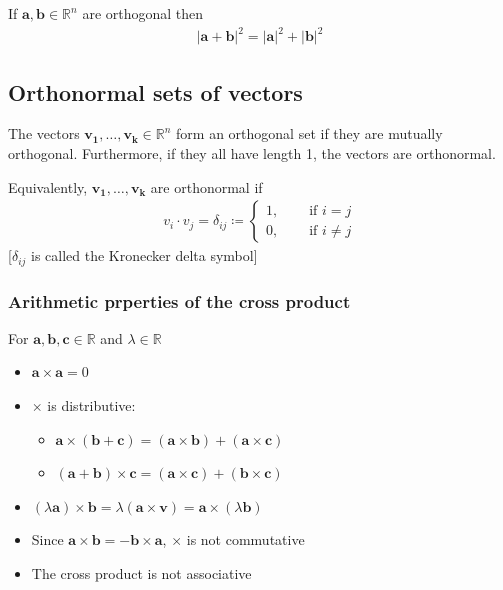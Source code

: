 \documentclass{report}
\renewcommand{\vec}{\mathbf}
\begin{document}
	If $\mathbf{a}, \mathbf{b} \in \mathbb{R}^n$ are orthogonal then
	\begin{align*}
		|\mathbf{a} + \mathbf{b}|^2 = |\mathbf{a}|^2 + |\mathbf{b}|^2
	\end{align*}

	\subsection{Orthonormal sets of vectors}

		The vectors $\mathbf{v_1}, \dots, \mathbf{v_k} \in \mathbb{R}^n$ form an orthogonal set if they are mutually orthogonal. Furthermore, if they all have length 1, the vectors are orthonormal.

		Equivalently, $\mathbf{v_1}, \dots, \mathbf{v_k}$ are orthonormal if
		\begin{align*}
			v_i \cdot v_j = \delta_{ij} \coloneq \begin{cases}1,\quad & \text{ if } i = j	\\ 0, & \text{ if } i \neq j\end{cases}
		\end{align*}
		[$\delta_{ij}$ is called the Kronecker delta symbol]


		\subsubsection{Arithmetic prperties of the cross product}
			
			For $\vec{a}, \vec{b}, \vec{c} \in \mathbb{R}$ and $\lambda \in \mathbb{R}$

				\begin{itemize}
					\item $\vec{a} \times \vec{a} = 0$
					\item $\times$ is distributive:
						\begin{itemize}
							\item $\vec{a} \times (\vec{b} + \vec{c}) = (\vec{a} \times \vec{b}) + (\vec{a} \times \vec{c})$
							\item $(\vec{a} + \vec{b}) \times \vec{c} = (\vec{a} \times \vec{c}) + (\vec{b} \times \vec{c})$
						\end{itemize}
					\item $(\lambda \vec{a}) \times \vec{b} = \lambda (\vec{a} \times \vec{v}) = \vec{a} \times (\lambda \vec{b})$
					\item Since $\vec{a} \times \vec{b} = -\vec{b} \times \vec{a}$, $\times$ is not commutative
					\item The cross product is not associative
				\end{itemize}
\end{document}
